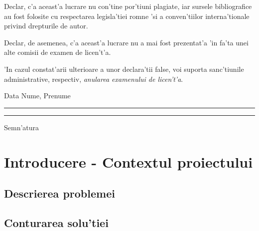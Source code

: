 \documentclass[12pt,a4paper,twoside]{report}
\newcommand{\uline}[1]{\rule[0pt]{#1}{0.4pt}}
\begin{document}
Declar, c'a aceast'a lucrare nu con'tine por'tiuni plagiate, iar sursele bibliografice au fost folosite cu respectarea legisla'tiei rom\ia ne 'si a conven'tiilor interna'tionale privind drepturile de autor.

Declar, de asemenea, c'a aceast'a lucrare nu a mai fost prezentat'a 'in fa'ta unei alte comisii de examen de licen't'a.

'In cazul constat'arii ulterioare a unor declara'tii false, voi suporta sanc'tiunile administrative, respectiv, \emph{anularea examenului de licen't'a}.

\vspace{1.5cm}

Data \hspace{8cm} Nume, Prenume

\vspace{0.5cm}

\uline{3cm} \hspace{5cm} \uline{5cm}

\vspace{1cm}
\hspace{9.4cm}Semn'atura

\thispagestyle{empty}

\newpage


 

\setcounter{page}{1}

\newpage

\tableofcontents

\newpage


\setcounter{page}{1}

\chapter{Introducere - Contextul proiectului}
\pagestyle{headings}
\section{Descrierea problemei}
\section{Conturarea solu'tiei}
\end{document}
